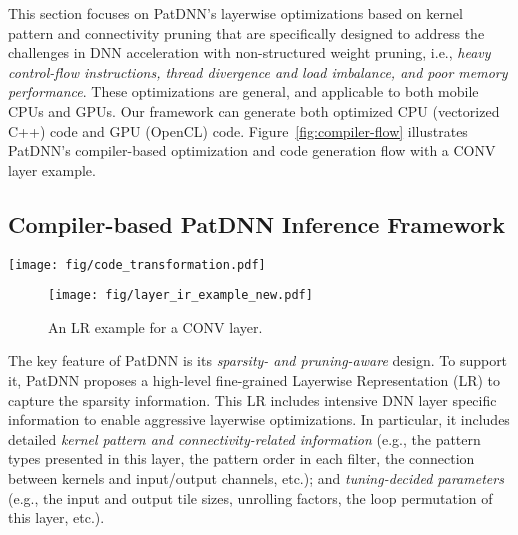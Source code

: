 \documentclass[sigplan,screen]{acmart}
\newcommand{\projectname}{PatDNN\xspace}
\begin{document}
This section focuses on \projectname's layerwise optimizations based on kernel pattern and connectivity pruning 
that are specifically designed to address the challenges in DNN acceleration with non-structured weight pruning, i.e., {\em heavy control-flow instructions, thread divergence and load imbalance, and poor memory performance}. These optimizations are general, and applicable to both mobile CPUs and GPUs. Our framework can generate both optimized CPU (vectorized C++) code and GPU (OpenCL) code. 
Figure~\ref{fig:compiler-flow} illustrates PatDNN's compiler-based optimization and code generation flow with a CONV layer example. 


\subsection{Compiler-based PatDNN Inference Framework}\label{sec:ir}

\begin{figure*}[t]\centering
    \texttt{[image: fig/code\_transformation.pdf]}
    \vspace{2mm}
    \caption{{\bf PatDNN's compiler-based optimization and code generation flow:} compiler takes both model codes with graph-based optimizations and a layerwise representation (as an example in Figure~\ref{fig:ir-example}) to generate low-level C/C++ and OpenCL codes (as {\tt No-opt}). This low-level code is further optimized with filter kernel reorder and our FKW compact model storage ({\tt +Reorder}), the register-level load redundancy elimination ({\tt +LRE}), and other optimizations like auto-tuning. Finally, the code is deployed on mobile devices.}
    \label{fig:compiler-flow}
\end{figure*}

\begin{figure}\centering
    \texttt{[image: fig/layer\_ir\_example\_new.pdf]}
    \vspace{2mm}
    \caption{An LR example for a CONV layer.}
    \label{fig:ir-example}
\end{figure}




The key feature of \projectname
is its {\em sparsity- and pruning-aware} design. To support it, \projectname proposes a high-level fine-grained Layerwise Representation (LR) to capture
the sparsity information.
This LR includes intensive DNN layer 
specific information to enable aggressive layerwise optimizations.
In particular, it includes detailed {\em kernel pattern and connectivity-related information} (e.g., the pattern types presented in this layer, the pattern order in each filter, the connection between kernels and input/output channels, etc.); and {\em tuning-decided parameters} (e.g., the input and output tile sizes, unrolling factors, the loop permutation of this layer, etc.).   
\end{document}
